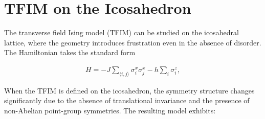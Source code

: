 \documentclass{article}
\begin{document}
\section{TFIM on the Icosahedron}

The transverse field Ising model (TFIM) can be studied on the icosahedral lattice, where the geometry introduces frustration even in the absence of disorder. The Hamiltonian takes the standard form

\begin{align}
H = -J \sum_{\langle i, j \rangle} \sigma_i^x \sigma_j^x - h \sum_i \sigma_i^z,
\end{align}

When the TFIM is defined on the icosahedron, the symmetry structure changes significantly due to the absence of translational invariance and the presence of non-Abelian point-group symmetries. The resulting model exhibits:
\end{document}
